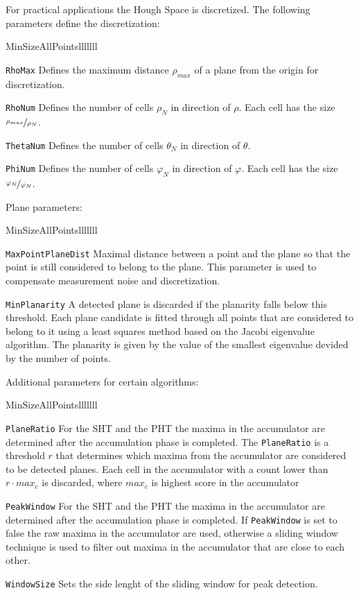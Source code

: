 \documentclass{InsightArticle}
\begin{document}
For practical applications the Hough Space is discretized. The following
parameters define the discretization:

\begin{liste}{MinSizeAllPointslllllll}
\item[\texttt{RhoMax}] Defines the maximum distance $\rho_{max}$ of a plane from the origin for
discretization.
\item[\texttt{RhoNum}] Defines the number of cells $\rho_{N}$ in direction of $\rho$. Each cell
has the size $\nicefrac{\rho_{max}}{\rho_{N}}$.
\item[\texttt{ThetaNum}] Defines the number of cells $\theta_{N}$ in direction of $\theta$.
\item[\texttt{PhiNum}] Defines the number of cells $\varphi_{N}$ in direction of $\varphi$. Each
cell has the size $\nicefrac{\varphi_{N}}{\varphi_{N}}$. 
\end{liste}

Plane parameters:

\begin{liste}{MinSizeAllPointslllllll}
\item[\texttt{MaxPointPlaneDist}] Maximal distance between a point and the
plane so that the point is still considered to belong to the plane. This
parameter is used to compensate measurement noise and discretization.
\item[\texttt{MinPlanarity}] A detected plane is discarded if the planarity
falls below this threshold. Each plane candidate is fitted through all points
that are considered to belong to it using a least squares method based on the
Jacobi eigenvalue algorithm. The planarity is given by the value of the smallest
eigenvalue devided by the number of points.
\end{liste}

Additional parameters for certain algorithms:

\begin{liste}{MinSizeAllPointslllllll}
\item[\texttt{PlaneRatio}] For the SHT and the PHT the maxima in the
accumulator are determined after the accumulation phase is completed. The
\texttt{PlaneRatio} is a threshold $r$ that determines which maxima from the
accumulator are considered to be detected planes. Each cell in the accumulator
with a count lower than $r\cdot max_c$ is discarded, where $max_c$ is highest score
in the accumulator
\item[\texttt{PeakWindow}] For the SHT and the PHT the maxima in the
accumulator are determined after the accumulation phase is completed. If
\texttt{PeakWindow} is set to false the raw maxima in the accumulator are used,
otherwise a sliding window technique is used to filter out maxima in the
accumulator that are close to each other.
\item[\texttt{WindowSize}] Sets the side lenght of the sliding window for
peak detection.
\end{liste}
\end{document}
